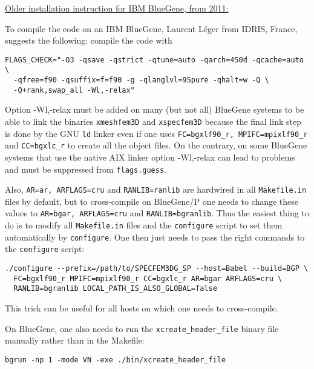 \noindent \underline{Older installation instruction for IBM BlueGene, from 2011:}\newline


\noindent To compile the code on an IBM BlueGene, Laurent L\'eger from
IDRIS, France, suggests the following: compile the code with
\begin{verbatim}
FLAGS_CHECK="-O3 -qsave -qstrict -qtune=auto -qarch=450d -qcache=auto \
  -qfree=f90 -qsuffix=f=f90 -g -qlanglvl=95pure -qhalt=w -Q \
  -Q+rank,swap_all -Wl,-relax"
\end{verbatim}

\noindent
Option \textquotedbl{}-Wl,-relax\textquotedbl{} must be
added on many (but not all) BlueGene systems to be able to link the
binaries \texttt{xmeshfem3D} and \texttt{xspecfem3D} because the final
link step is done by the GNU \texttt{ld} linker even if one uses \texttt{FC=bgxlf90\_r,
MPIFC=mpixlf90\_r} and \texttt{CC=bgxlc\_r} to create all the object
files. On the contrary, on some BlueGene systems that use the native
AIX linker option \textquotedbl{}-Wl,-relax\textquotedbl{} can lead
to problems and must be suppressed from \texttt{flags.guess}.

\noindent Also, \texttt{AR=ar, ARFLAGS=cru} and \texttt{RANLIB=ranlib}
are hardwired in all \texttt{Makefile.in} files by default, but to
cross-compile on BlueGene/P one needs to change these values to \texttt{AR=bgar,
ARFLAGS=cru} and \texttt{RANLIB=bgranlib}. Thus the easiest thing
to do is to modify all \texttt{Makefile.in} files and the \texttt{configure}
script to set them automatically by \texttt{configure}. One then just
needs to pass the right commands to the \texttt{configure} script:
\begin{verbatim}
./configure --prefix=/path/to/SPECFEM3DG_SP --host=Babel --build=BGP \
  FC=bgxlf90_r MPIFC=mpixlf90_r CC=bgxlc_r AR=bgar ARFLAGS=cru \
  RANLIB=bgranlib LOCAL_PATH_IS_ALSO_GLOBAL=false
\end{verbatim}

\noindent This trick can be useful for all hosts on which one needs
to cross-compile.

\noindent On BlueGene, one also needs to run the \texttt{xcreate\_header\_file}
binary file manually rather than in the Makefile:

\noindent
\begin{verbatim}
bgrun -np 1 -mode VN -exe ./bin/xcreate_header_file
\end{verbatim}


